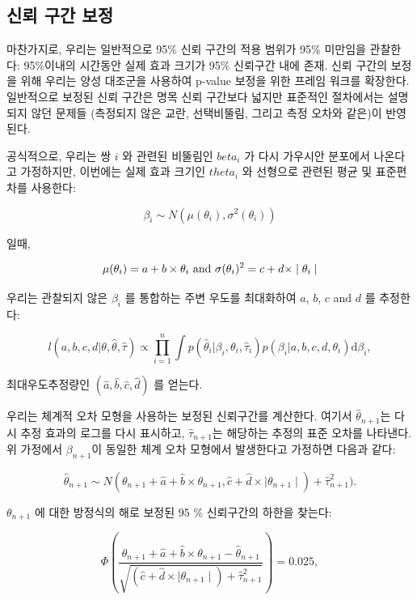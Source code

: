 \documentclass[10.5pt]{book}
\theoremstyle{definition}
\theoremstyle{definition}
\theoremstyle{definition}
\theoremstyle{remark}
\begin{document}
\subsection{신뢰 구간 보정}\label{--}


마찬가지로, 우리는 일반적으로 95\% 신뢰 구간의 적용 범위가 95\% 미만임을
관찰한다: 95\%이내의 시간동안 실제 효과 크기가 95\% 신뢰구간 내에 존재.
신뢰 구간의 보정 \citep{schuemie_2018} 을 위해 우리는 양성 대조군을
사용하여 p-value 보정을 위한 프레임 워크를 확장한다. 일반적으로 보정된
신뢰 구간은 명목 신뢰 구간보다 넓지만 표준적인 절차에서는 설명되지 않던
문제들 (측정되지 않은 교란, 선택비뚤림, 그리고 측정 오차와 같은)이
반영된다.

공식적으로, 우리는 쌍 \(i\) 와 관련된 비뚤림인 \(beta_i\) 가 다시
가우시안 분포에서 나온다고 가정하지만, 이번에는 실제 효과 크기인
\(theta_i\) 와 선형으로 관련된 평균 및 표준편차를 사용한다:

\[\beta_i \sim N(\mu(\theta_i) , \sigma^2(\theta_i))\]

일때,

\[\mu(\theta_i) = a + b \times \theta_i \text{ and } \\
  \sigma(\theta_i) ^2= c + d \times \mid \theta_i \mid\]

우리는 관찰되지 않은 \(\beta_i\) 를 통합하는 주변 우도를 최대화하여
\(a\), \(b\), \(c\) and \(d\) 를 추정한다:

\[l(a,b,c,d | \theta, \hat{\theta}, \hat{\tau} ) \propto \prod_{i=1}^{n}\int p(\hat{\theta}_i|\beta_i, \theta_i, \hat{\tau}_i)p(\beta_i|a,b,c,d,\theta_i) \text{d}\beta_i ,\]

최대우도추정량인 \((\hat{a}, \hat{b}, \hat{c}, \hat{d})\) 를 얻는다.

우리는 체계적 오차 모형을 사용하는 보정된 신뢰구간를 계산한다. 여기서
\(\hat{\theta}_{n+1}\)는 다시 추정 효과의 로그를 다시 표시하고,
\(\hat{\tau}_{n+1}\)는 해당하는 추정의 표준 오차를 나타낸다. 위 가정에서
\(\beta_{n+1}\)이 동일한 체계 오차 모형에서 발생한다고 가정하면 다음과
같다:

\[\hat{\theta}_{n+1} \sim N(
\theta_{n+1} + \hat{a} + \hat{b} \times \theta_{n+1},
\hat{c} + \hat{d} \times \mid \theta_{n+1} \mid) + \hat{\tau}_{n+1}^2) .\]

\(\theta_{n+1}\) 에 대한 방정식의 해로 보정된 95 \% 신뢰구간의 하한을
찾는다:

\[\Phi\left(
\frac{\theta_{n+1} + \hat{a} + \hat{b} \times \theta_{n+1}-\hat{\theta}_{n+1}}
{\sqrt{(\hat{c} + \hat{d} \times \mid \theta_{n+1} \mid) + \hat{\tau}_{n+1}^2}}
\right) = 0.025 ,\]
\end{document}
